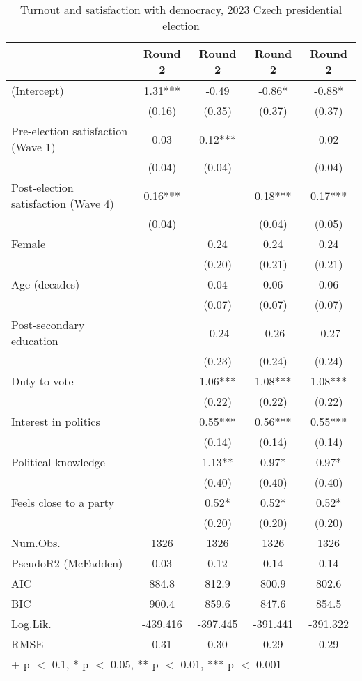 \begin{table}

\caption{Turnout and satisfaction with democracy, 2023 Czech presidential election}
\centering
\begin{tabular}[t]{lcccc}
\toprule
  & Round 2 & Round 2  & Round 2   & Round 2   \\
\midrule
(Intercept) & 1.31*** & -0.49 & -0.86* & -0.88*\\
 & (0.16) & (0.35) & (0.37) & (0.37)\\
Pre-election satisfaction (Wave 1) & 0.03 & 0.12*** &  & 0.02\\
 & (0.04) & (0.04) &  & (0.04)\\
Post-election satisfaction (Wave 4) & 0.16*** &  & 0.18*** & 0.17***\\
 & (0.04) &  & (0.04) & (0.05)\\
Female &  & 0.24 & 0.24 & 0.24\\
 &  & (0.20) & (0.21) & (0.21)\\
Age (decades) &  & 0.04 & 0.06 & 0.06\\
 &  & (0.07) & (0.07) & (0.07)\\
Post-secondary education &  & -0.24 & -0.26 & -0.27\\
 &  & (0.23) & (0.24) & (0.24)\\
Duty to vote &  & 1.06*** & 1.08*** & 1.08***\\
 &  & (0.22) & (0.22) & (0.22)\\
Interest in politics &  & 0.55*** & 0.56*** & 0.55***\\
 &  & (0.14) & (0.14) & (0.14)\\
Political knowledge &  & 1.13** & 0.97* & 0.97*\\
 &  & (0.40) & (0.40) & (0.40)\\
Feels close to a party &  & 0.52* & 0.52* & 0.52*\\
 &  & (0.20) & (0.20) & (0.20)\\
\midrule
Num.Obs. & 1326 & 1326 & 1326 & 1326\\
PseudoR2 (McFadden) & 0.03 & 0.12 & 0.14 & 0.14\\
AIC & 884.8 & 812.9 & 800.9 & 802.6\\
BIC & 900.4 & 859.6 & 847.6 & 854.5\\
Log.Lik. & -439.416 & -397.445 & -391.441 & -391.322\\
RMSE & 0.31 & 0.30 & 0.29 & 0.29\\
\bottomrule
\multicolumn{5}{l}{\rule{0pt}{1em}+ p $<$ 0.1, * p $<$ 0.05, ** p $<$ 0.01, *** p $<$ 0.001}\\
\end{tabular}
\end{table}
